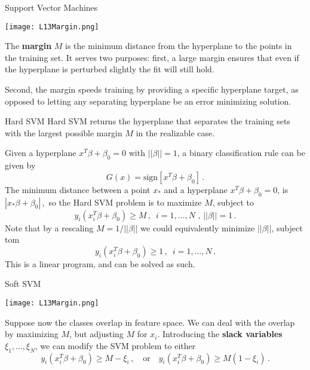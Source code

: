 \documentclass[10pt, table, dvipsnames,xcdraw]{beamer}
\begin{document}
\begin{frame}[fragile]{Support Vector Machines}
  \begin{minipage}[t][0.5\textheight][t]{\textwidth}
	\centering \texttt{[image: L13Margin.png]}
  \end{minipage}
  \vfill
\begin{minipage}[t][0.5\textheight][t]{\textwidth}
The \textbf{margin} $M$ is the minimum distance from the hyperplane to the points in the training set. It serves two purposes: first, a large margin ensures that even if the hyperplane is perturbed slightly the fit will still hold.\pause 

Second, the margin speeds training by providing a specific hyperplane target, as opposed to letting any separating hyperplane be an error minimizing solution. 
\end{minipage}
\end{frame}




\begin{frame}[fragile]{Hard SVM}
Hard SVM returns the hyperplane that separates the training sets with the largest possible margin $M$ in the realizable case. \pause 

Given a hyperplane $x^T\beta + \beta_0 = 0$ with $||\beta|| = 1$, a binary classification rule can be given by
$$
G(x) = \text{sign}\left[x^T\beta + \beta_0  \right]\,.
$$\pause
The minimum distance between a point $x_*$ and a hyperplane $x^T\beta + \beta_0 = 0$, is $|x_*\beta + \beta_0|\,,$ so the Hard SVM problem is to maximize $M$, subject to
$$
y_i(x_i^T\beta + \beta_0)\geq M\,,\,\,\, i = 1,\ldots, N\,\,,\,||\beta|| = 1\,.
$$\pause
Note that by a rescaling $M = 1/||\beta||$ we could equivalently minimize $||\beta||$, subject tom
$$
y_i(x_i^T\beta + \beta_0)\geq 1\,,\,\,\, i = 1,\ldots, N\,.
$$
This is a linear program, and can be solved as such. 
\end{frame}




\begin{frame}[fragile]{Soft SVM}
  \begin{minipage}[t][0.5\textheight][t]{\textwidth}
	\centering \texttt{[image: L13Margin.png]}
  \end{minipage}
  \vfill
\begin{minipage}[t][0.5\textheight][t]{\textwidth}
Suppose now the classes overlap in feature space. We can deal with the overlap by maximizing $M$, but adjusting $M$ for $x_i$. Introducing the \textbf{slack variables} $\xi_1,\ldots, \xi_N$, we can modify the SVM problem to either\pause
$$
y_i(x_i^T\beta + \beta_0) \geq M - \xi_i\,,\hspace{1em}\text{or}\hspace{1em}
y_i(x_i^T\beta + \beta_0) \geq M(1 - \xi_i)\,.
$$
\end{minipage}
\end{frame}
\end{document}

